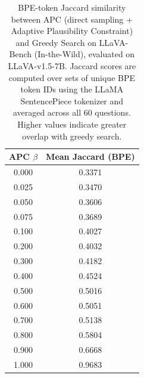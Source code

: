 \documentclass[11pt]{article}
\begin{document}
\begin{table}[ht]
\centering
\caption{BPE-token Jaccard similarity between APC (direct sampling + Adaptive Plausibility
Constraint) and Greedy Search on LLaVA-Bench (In-the-Wild), evaluated on LLaVA-v1.5-7B.
Jaccard scores are computed over sets of unique BPE token IDs using the LLaMA SentencePiece
tokenizer and averaged across all 60 questions. Higher values indicate greater overlap with
greedy search.}
\label{tab:jaccard_apc_greedy}

\setlength{\tabcolsep}{10pt}
\renewcommand{\arraystretch}{1.2}

\begin{tabular}{cc}
\toprule
\textbf{APC $\beta$} & \textbf{Mean Jaccard (BPE)} \\
\midrule
0.000 & 0.3371 \\
0.025 & 0.3470 \\
0.050 & 0.3606 \\
0.075 & 0.3689 \\
0.100 & 0.4027 \\
0.200 & 0.4032 \\
0.300 & 0.4182 \\
0.400 & 0.4524 \\
0.500 & 0.5016 \\
0.600 & 0.5051 \\
0.700 & 0.5138 \\
0.800 & 0.5804 \\
0.900 & 0.6668 \\
1.000 & 0.9683 \\
\bottomrule
\end{tabular}

\end{table}

\bigskip
\end{document}
